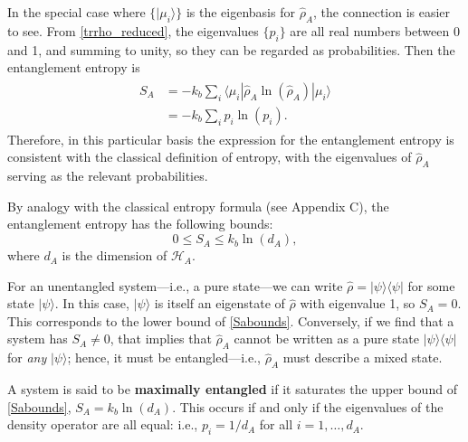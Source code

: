 \documentclass[pra,12pt]{revtex4}
\begin{document}
In the special case where $\{|\mu_i\rangle\}$ is the eigenbasis for
$\hat{\rho}_A$, the connection is easier to see.  From
\eqref{trrho_reduced}, the eigenvalues $\{p_i\}$ are all real numbers
between 0 and 1, and summing to unity, so they can be regarded as
probabilities.  Then the entanglement entropy is
\begin{align}
  \begin{aligned}S_A &= -k_b \sum_i \langle \mu_i | \hat{\rho}_A \ln(\hat{\rho}_A) | \mu_i\rangle  \\ &= - k_b \sum_i p_i \ln(p_i).
  \end{aligned}
\end{align}
Therefore, in this particular basis the expression for the
entanglement entropy is consistent with the classical definition of
entropy, with the eigenvalues of $\hat{\rho}_A$ serving as the
relevant probabilities.

By analogy with the classical entropy formula (see Appendix C), the
entanglement entropy has the following bounds:
\begin{equation}
  0 \le S_A \le k_b\ln(d_A),
  \label{Sabounds}
\end{equation}
where $d_A$ is the dimension of $\mathscr{H}_A$.

For an unentangled system---i.e., a pure state---we can write
$\hat{\rho} = |\psi\rangle\langle\psi|$ for some state $|\psi\rangle$.
In this case, $|\psi\rangle$ is itself an eigenstate of $\hat{\rho}$
with eigenvalue 1, so $S_{A} = 0$.  This corresponds to the lower
bound of \eqref{Sabounds}.  Conversely, if we find that a system has
$S_{A} \ne 0$, that implies that $\hat{\rho}_A$ cannot be written as a
pure state $|\psi\rangle\langle\psi|$ for \textit{any} $|\psi\rangle$;
hence, it must be entangled---i.e., $\hat{\rho}_A$ must describe a
mixed state.

A system is said to be \textbf{maximally entangled} if it saturates
the upper bound of \eqref{Sabounds}, $S_A = k_b \ln(d_A)$.  This
occurs if and only if the eigenvalues of the density operator are all
equal: i.e., $p_i = 1/d_A$ for all $i = 1, \dots, d_A$.
\end{document}
